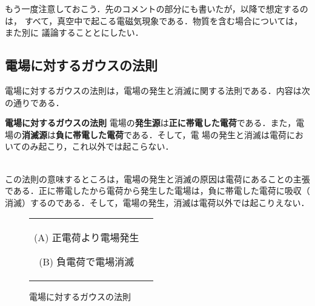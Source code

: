         もう一度注意しておこう．先のコメントの部分にも書いたが，以降で想定するのは，
        すべて，真空中で起こる電磁気現象である．物質を含む場合については，また別に
        議論することとにしたい．


        \subsection{電場に対するガウスの法則}
        電場に対するガウスの法則は，電場の発生と消滅に関する法則である．内容は次
        の通りである．
            \\
            \begin{itembox}[l]{\textbf{電場に対するガウスの法則}}
                電場の\textbf{発生源}は\textbf{正に帯電した電荷}である．また，電
                場の\textbf{消滅源}は\textbf{負に帯電した電荷}である．そして，電
                場の発生と消滅は電荷においてのみ起こり，これ以外では起こらない．
            \end{itembox}
            \\

        この法則の意味するところは，電場の発生と消滅の原因は電荷にあることの主張
        である．正に帯電したから電荷から発生した電場は，負に帯電した電荷に吸収（
        消滅）するのである．そして，電場の発生，消滅は電荷以外では起こりえない．
               \begin{figure}[hbt]
                    \begin{tabular}{cc}
                        \begin{minipage}{0.5\hsize}
                            \begin{center}
                                {GaussLowImage_01.pdf}

                                (A) 正電荷より電場発生
                            \end{center}
                        \end{minipage}
                        \begin{minipage}{0.5\hsize}
                            \begin{center}
                                {GaussLowImage_02.pdf}

                                (B) 負電荷で電場消滅
                            \end{center}
                        \end{minipage}
                    \end{tabular}
                                \caption{電場に対するガウスの法則}
                                \label{fig:GaussLowImage}
                \end{figure}


